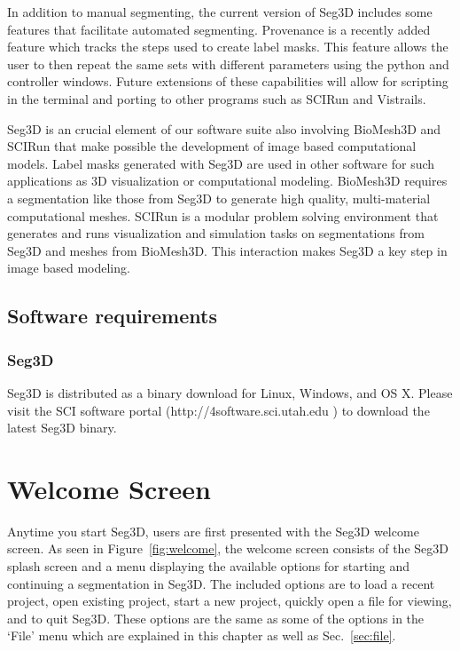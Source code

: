 \documentclass[fleqn,11pt,openany]{book}
\begin{document}
In addition to manual segmenting, the current version of Seg3D includes some features that facilitate automated segmenting.  Provenance is a recently added feature which tracks the steps used to create label masks.  This feature allows the user to then repeat the same sets with different parameters using the python and controller windows.  Future extensions of these capabilities will allow for scripting in the terminal and porting to other programs such as SCIRun and Vistrails.

Seg3D is an crucial element of our software suite also involving BioMesh3D and SCIRun that make possible the development of image based computational models.  Label masks generated with Seg3D are used in other software  for such applications as 3D visualization or computational modeling.  BioMesh3D requires a segmentation like those from Seg3D to generate high quality, multi-material computational meshes.  SCIRun is a modular problem solving environment that generates and runs visualization and simulation tasks on segmentations from Seg3D and meshes from BioMesh3D.  This interaction makes Seg3D a key step in image based modeling.

\section{Software requirements}

\subsection{Seg3D \SegthreeDVersion}

Seg3D is distributed as a binary download for Linux, Windows, and OS X. Please visit the SCI software portal ({http://4software.sci.utah.edu} ) to download the latest Seg3D binary. 



\chapter{Welcome Screen}
\label{sec:welcome}

\begin{introduction}
Anytime you start Seg3D, users are first presented with the Seg3D welcome screen.  As seen in Figure~\ref{fig:welcome}, the welcome screen consists of the Seg3D splash screen and a menu displaying the available options for starting and continuing a segmentation in Seg3D.  The included options are to load a recent project, open existing project, start a new project, quickly open a file for viewing, and to quit Seg3D.  These options are the same as some of the options in the `File' menu which are explained in this chapter as well as Sec.~\ref{sec:file}.
\end{introduction}
\end{document}
